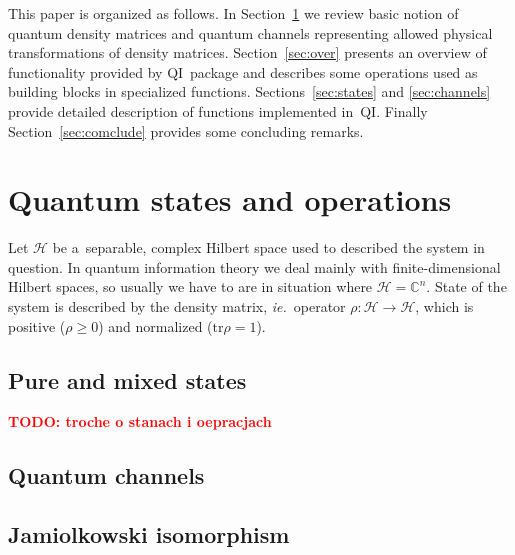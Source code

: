 \documentclass[final,5p,times]{elsarticle}
\newcommand{\1}{{\rm 1\hspace{-0.9mm}l}}
\newcommand{\tr}{\mathrm{tr}}
\newcommand{\qi}{QI}
\newcommand{\HS}[1]{\ensuremath{\mathcal{#1}}} %
\newcommand{\Cplx}{\ensuremath{\mathbb{C}}}
\newcommand{\ie}{\emph{ie.}}
\newcommand{\todo}[1]{\textcolor{red}{\bf TODO: #1}}
\begin{document}
This paper is organized as follows. In Section~\ref{sec:qi-intro} we review
basic notion of quantum density matrices and quantum channels representing
allowed physical transformations of density matrices. Section~\ref{sec:over}
presents an overview of functionality provided by \qi\ package and describes
some operations used as building blocks in specialized functions.
Sections~\ref{sec:states} and \ref{sec:channels} provide detailed description of
functions implemented in~\qi. Finally Section~\ref{sec:comclude} provides some
concluding remarks.

\section{Quantum states and operations}\label{sec:qi-intro}
Let $\HS{H}$ be a~separable, complex Hilbert space used to described the system
in question. In quantum information theory we deal mainly with
finite-dimensional Hilbert spaces, so usually we have to are in situation where
$\HS{H}=\Cplx^n$. State of the system is described by the density matrix, \ie\
operator $\rho:\HS{H}\rightarrow\HS{H}$, which is positive ($\rho\geq0$) and
normalized ($\tr{\rho}=1$). 

\subsection{Pure and mixed states}
\todo{troche o stanach i oepracjach}


\subsection{Quantum channels}



\subsection{Jamiolkowski isomorphism}
\end{document}
